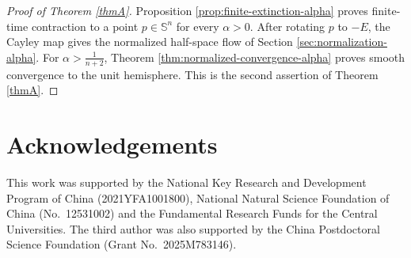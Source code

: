 \documentclass[11pt, reqno]{amsart}
\theoremstyle{remark}
\theoremstyle{definition}
\numberwithin{equation}{section}
\newcommand{\Sph}{\mathbb S}
\begin{document}
\begin{proof}[Proof of Theorem \ref{thmA}]
Proposition \ref{prop:finite-extinction-alpha} proves finite-time contraction
to a point $p\in\Sph^n$ for every $\alpha>0$.  After rotating $p$ to $-E$, the
Cayley map gives the normalized half-space flow of Section
\ref{sec:normalization-alpha}.  For $\alpha > \frac{1}{n+2}$, Theorem
\ref{thm:normalized-convergence-alpha} proves smooth convergence to the unit
hemisphere.  This is the second assertion of Theorem \ref{thmA}.
\end{proof}


\section*{Acknowledgements}
This work was supported by the National Key Research and Development Program of China (2021YFA1001800), National Natural Science Foundation of China (No.~12531002) and the Fundamental Research Funds for the Central Universities.  The third author was also supported by the China Postdoctoral Science Foundation (Grant No.~2025M783146).
\end{document}
